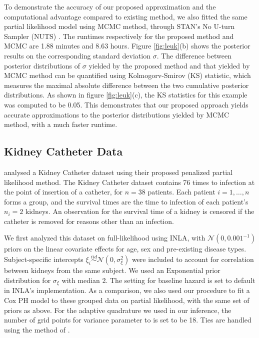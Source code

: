 \documentclass[ba]{imsart}
\begin{document}
To demonstrate the accuracy of our proposed approximation and the computational advantage compared to existing method, we also fitted the same partial likelihood model using MCMC method, through STAN's No U-turn Sampler (NUTS) \citep{NUTS}. The runtimes respectively for the proposed method and MCMC are 1.88 minutes and 8.63 hours. Figure \ref{fig:leuk}(b) shows the posterior results on the corresponding standard deviation $\sigma$. The difference between posterior distributions of $\sigma$ yielded by the proposed method and that yielded by MCMC method can be quantified using Kolmogorv-Smirov (KS) statistic, which measures the maximal absolute difference between the two cumulative posterior distributions. As shown in figure \ref{fig:leuk}(c), the KS statistics for this example was computed to be 0.05. This demonstrates that our proposed approach yields accurate approximations to the posterior distributions yielded by MCMC method, with a much faster runtime.




\subsection{Kidney Catheter Data}\label{subsec:kidney}

\cite{freqPL} analysed a Kidney Catheter dataset using their proposed penalized partial likelihood method. The Kidney Catheter dataset contains 76 times to infection at the point of insertion of a catheter, for $n = 38$ patients. Each patient $i=1,\ldots,n$ forms a group, and the survival times are the time to infection of each patient's $n_{i} = 2$ kidneys. An observation for the survival time of a kidney is censored if the catheter is removed for reasons other than an infection. 

We first analyzed this dataset on full-likelihood using INLA, with $\mathcal{N}(0, 0.001^{-1})$ priors on the linear covariate effects for age, sex and pre-existing disease types. Subject-specific intercepts $\xi_{i}\overset{iid}{\sim}\mathcal{N}(0,\sigma^{2}_{\xi})$ were included to account for correlation between kidneys from the same subject. We used an $\text{Exponential}$ prior distribution for $\sigma_{\xi}$ with median 2. The setting for baseline hazard is set to default in INLA's implementation. As a comparison, we also used our procedure to fit a Cox PH model to these grouped data on partial likelihood, with the same set of priors as above. For the adaptive quadrature we used in our inference, the number of grid points for variance parameter to is set to be 18. Ties are handled using the method of \cite{Breslow}.
\end{document}
